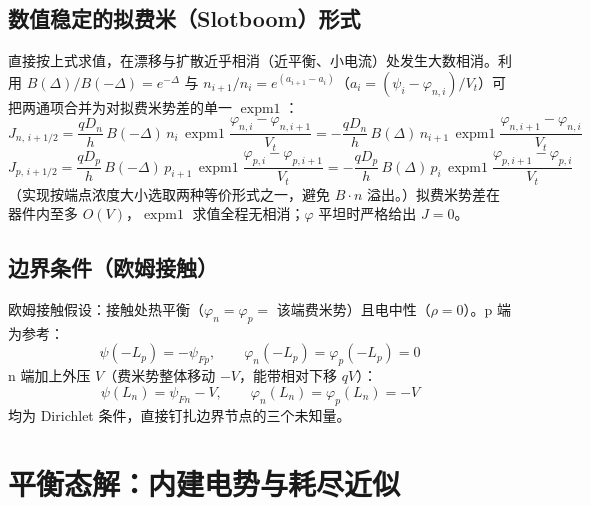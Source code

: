\documentclass[11pt]{ctexart}
\begin{document}
\subsection{数值稳定的拟费米（Slotboom）形式}
直接按上式求值，在漂移与扩散近乎相消（近平衡、小电流）处发生大数相消。利用 $B(\Delta)/B(-\Delta)=e^{-\Delta}$ 与 $n_{i+1}/n_i=e^{(a_{i+1}-a_i)}$（$a_i=(\psi_i-\varphi_{n,i})/V_t$）可把两通项合并为对拟费米势差的单一 $\operatorname{expm1}$：
\[J_{n,\,i+1/2}=\frac{qD_n}{h}\,B(-\Delta)\,n_i\,\operatorname{expm1}\!\frac{\varphi_{n,i}-\varphi_{n,i+1}}{V_t}
=-\frac{qD_n}{h}\,B(\Delta)\,n_{i+1}\,\operatorname{expm1}\!\frac{\varphi_{n,i+1}-\varphi_{n,i}}{V_t}\]
\[J_{p,\,i+1/2}=\frac{qD_p}{h}\,B(-\Delta)\,p_{i+1}\,\operatorname{expm1}\!\frac{\varphi_{p,i}-\varphi_{p,i+1}}{V_t}
=-\frac{qD_p}{h}\,B(\Delta)\,p_i\,\operatorname{expm1}\!\frac{\varphi_{p,i+1}-\varphi_{p,i}}{V_t}\]
（实现按端点浓度大小选取两种等价形式之一，避免 $B\cdot n$ 溢出。）拟费米势差在器件内至多 $O(V)$，$\operatorname{expm1}$ 求值全程无相消；$\varphi$ 平坦时严格给出 $J=0$。

\subsection{边界条件（欧姆接触）}
欧姆接触假设：接触处热平衡（$\varphi_n=\varphi_p=$ 该端费米势）且电中性（$\rho=0$）。p 端为参考：
\[\psi(-L_p)=-\psi_{Fp},\qquad \varphi_n(-L_p)=\varphi_p(-L_p)=0\]
n 端加上外压 $V$（费米势整体移动 $-V$，能带相对下移 $qV$）：
\[\psi(L_n)=\psi_{Fn}-V,\qquad \varphi_n(L_n)=\varphi_p(L_n)=-V\]
均为 Dirichlet 条件，直接钉扎边界节点的三个未知量。

\section{平衡态解：内建电势与耗尽近似}
\end{document}
